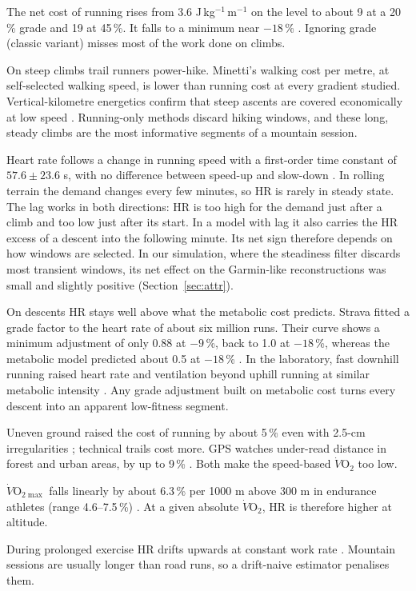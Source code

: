 \documentclass[11pt,a4paper]{article}
\newcommand{\VO}{\ensuremath{\dot V\mathrm{O}_2}}
\newcommand{\VOmax}{\ensuremath{\dot V\mathrm{O}_{2\max}}}
\begin{document}
\begin{description}[leftmargin=0pt,style=unboxed]
\item[M1 --- Grade.] The net cost of running rises from 3.6 J\,kg$^{-1}$\,m$^{-1}$ on the level to about 9 at a 20\,\% grade and 19 at 45\,\%. It falls to a minimum near $-18$\,\% \citep{minetti2002,vernillo2017}. Ignoring grade (classic variant) misses most of the work done on climbs.
\item[M2 --- Gait.] On steep climbs trail runners power-hike. Minetti's walking cost per metre, at self-selected walking speed, is lower than running cost at every gradient studied. Vertical-kilometre energetics confirm that steep ascents are covered economically at low speed \citep{minetti2002,giovanelli2016}. Running-only methods discard hiking windows, and these long, steady climbs are the most informative segments of a mountain session.
\item[M3 --- HR kinetics.] Heart rate follows a change in running speed with a first-order time constant of $57.6\pm23.6$ s, with no difference between speed-up and slow-down \citep{hunt2015}. In rolling terrain the demand changes every few minutes, so HR is rarely in steady state. The lag works in both directions: HR is too high for the demand just after a climb and too low just after its start. In a model with lag it also carries the HR excess of a descent into the following minute. Its net sign therefore depends on how windows are selected. In our simulation, where the steadiness filter discards most transient windows, its net effect on the Garmin-like reconstructions was small and slightly positive (Section~\ref{sec:attr}).
\item[M4 --- Descents.] On descents HR stays well above what the metabolic cost predicts. Strava fitted a grade factor to the heart rate of about six million runs. Their curve shows a minimum adjustment of only 0.88 at $-9$\,\%, back to 1.0 at $-18$\,\%, whereas the metabolic model predicted about 0.5 at $-18$\,\% \citep{robb2017}. In the laboratory, fast downhill running raised heart rate and ventilation beyond uphill running at similar metabolic intensity \citep{lemire2021}. Any grade adjustment built on metabolic cost turns every descent into an apparent low-fitness segment.
\item[M5 --- Terrain and GPS.] Uneven ground raised the cost of running by about 5\,\% even with 2.5-cm irregularities \citep{voloshina2015}; technical trails cost more. GPS watches under-read distance in forest and urban areas, by up to 9\,\% \citep{gilgen2020}. Both make the speed-based \VO{} too low.
\item[M6 --- Altitude.] \VOmax{} falls linearly by about 6.3\,\% per 1000 m above 300 m in endurance athletes (range 4.6--7.5\,\%) \citep{wehrlin2006}. At a given absolute \VO{}, HR is therefore higher at altitude.
\item[M7 --- Duration and cardiac drift.] During prolonged exercise HR drifts upwards at constant work rate \citep{coyle2001}. Mountain sessions are usually longer than road runs, so a drift-naive estimator penalises them.
\end{description}
\end{document}
